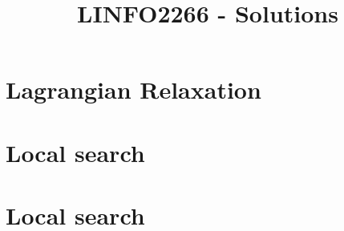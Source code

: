 \documentclass{article}
\title{LINFO2266 - Solutions}
\begin{document}
\maketitle

\section{Lagrangian Relaxation}


\section{Local search}


\section{Local search}

\end{document}
